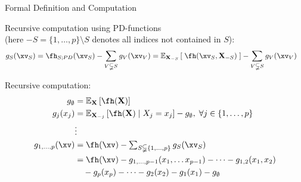 \documentclass[10pt,compress,t,notes=noshow, xcolor=table]{beamer}
\newcommand{\open}{}
\newcommand{\close}{}
\newcommand{\Xv}{\mathbf{X}} %
\begin{document}
\begin{framev}[align=top]{Formal Definition and Computation
}
\begin{definition}
Recursive computation using PD-functions \\
(here $-S = \{1, \ldots, p \} \setminus S$ denotes all indices not contained in \(S\)):
\begin{align*}
g_{S}(\xv_S)
& = \fh_{S;PD}(\xv_S) - \sum_{V \subsetneqq S} g_V(\xv_V)
= \mathbb{E}_{\Xv_{-S}} \left[ \; \fh(\xv_S, \Xv_{-S}) \; \right] - \sum_{V \subsetneqq S} g_V(\xv_V)
\end{align*}
\end{definition}
\begin{itemizeM}
\item Recursive computation:
\begin{align*}
g_{\open \emptyset \close} &= \mathbb{E}_\Xv\left[\fh(\Xv)\right] \\
g_{\open j \close}(x_j) &= \mathbb{E}_{\Xv_{-j}}\left[\fh(\Xv) \; \vert  \; X_j = x_j \right] - g_{\open \emptyset \close}, \; \forall j \in \{1, \ldots, p\} \\%
& \vdots \\
g_{\open 1, \dots, p \close}(\xv)
& = \fh(\xv) -
\textstyle\sum_{S \subsetneqq \{1,\ldots,p\}} g_{S}(\xv_S) \\
& = \fh(\xv) -
g_{\open 1, \dots, p-1 \close}(x_{1}, \dots x_{p-1}) - \dots - g_{\open 1, 2 \close}(x_1, x_2) \\
& \quad - g_{\open p \close}(x_p)  - \dots - g_{\open 2 \close}(x_2) - g_{\open 1 \close}(x_1) - g_{\open \emptyset \close}
\end{align*}
\end{itemizeM}
\end{framev}
\end{document}
